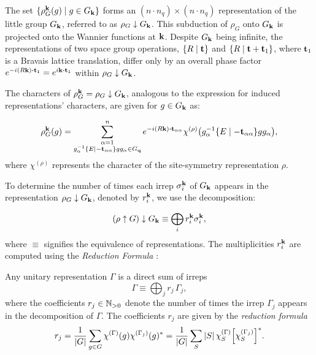 \documentclass[12pt]{report}
\begin{document}
\n

The set \(\{\rho_G^{\vb{k}}(g) \mid g \in G_{\vb{k}}\}\) forms an \((n \cdot n_q) \times (n \cdot n_q)\) representation of the little group \(G_{\vb{k}}\), referred to as \(\rho_G \downarrow G_{\vb{k}}\). This subduction of \(\rho_G\) onto \(G_{\vb{k}}\) is projected onto the Wannier functions at \({\vb{k}}\). Despite \(G_{\vb{k}}\) being infinite, the representations of two space group operations, \(\{ R \mid {\vb{t}} \}\) and \(\{ R \mid {\vb{t}} + {\vb{t}}_1 \}\), where \({\vb{t}}_1\) is a Bravais lattice translation, differ only by an overall phase factor \(e^{-i(R\k) \vdot \t_1} = e^{i\k \vdot \t_1}\) within \(\rho_G \downarrow G_{\vb{k}}\).

The characters of \(\rho_G^{\vb{k}} = \rho_G \downarrow G_{\vb{k}}\), analogous to the expression for induced representations' characters, are given for \(g \in G_{\vb{k}}\) as:

\begin{equation} \label{eq:}
\rho_G^\k(g) =
\sum_{\substack{\alpha=1 \\ g_\alpha^{-1}\sg{E}{-\t_{\alpha\alpha}}g g_\alpha \in G_\q}}^n e^{-i(R\k)\vdot\t_{\alpha\alpha}}
\chi^{(\rho)}\qty(g_\alpha^{-1}\sg{E}{-\t_{\alpha\alpha}}g g_\alpha),
\end{equation}
where \(\chi^{(\rho)}\) represents the character of the site-symmetry representation \(\rho\).

To determine the number of times each irrep \(\sigma_i^{\vb{k}}\) of \(G_{\vb{k}}\) appears in the representation \(\rho_G \downarrow G_{\vb{k}}\), denoted by \(r_i^{\vb{k}}\), we use the decomposition:

\begin{equation} \label{eq:induce_subduce}
(\rho \uparrow G) \downarrow G_{\vb{k}} \equiv \bigoplus_i r_i^{\vb{k}} \sigma_i^{\vb{k}},
\end{equation}
where \(\equiv\) signifies the equivalence of representations. The multiplicities \(r_i^{\vb{k}}\) are computed using the \textit{Reduction Formula} \cite{dresselhaus}:

\begin{theorem} \label{th:reduction_formula}
Any unitary representation $\Gamma$ is a direct sum of irreps
\begin{equation} \label{eq:Gamma_direct_sum_of_irreps}
\Gamma \equiv \bigoplus_j r_j \, \Gamma_j,
\end{equation}
where the coefficients $r_j \in {\mathbb{N}}_{>0}$ denote the number of times the irrep $\Gamma_j$ appears in the decomposition of $\Gamma$. The coefficients $r_j$ are given by the \textit{reduction formula}
\begin{equation} \label{eq:reduction_formula}
r_j =
\frac{1}{\abs{G}} \sum_{g \in G} \chi^{(\Gamma)}(g) \chi^{(\Gamma_j)}(g)^* =
\frac{1}{\abs{G}} \sum_{S} \abs{S} \, \chi^{(\Gamma)}_S \qty[\chi^{(\Gamma_j)}_S]^*.
\end{equation}
\end{theorem}
\end{document}
